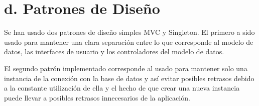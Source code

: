 \documentclass[11pt]{utalcaDoc}
\begin{document}
\section*{d. Patrones de Diseño}

Se han usado dos patrones de diseño simples MVC y Singleton. El primero a sido usado para mantener una clara separación entre lo que corresponde al modelo de datos, las interfaces de usuario y los controladores del modelo de datos.

El segundo patrón implementado corresponde al usado para mantener solo una instancia de la conexión con la base de datos y así evitar posibles retrasos debido a la constante utilización de ella y el hecho de que crear una nueva instancia puede llevar a posibles retrasos innecesarios de la aplicación.
\end{document}

